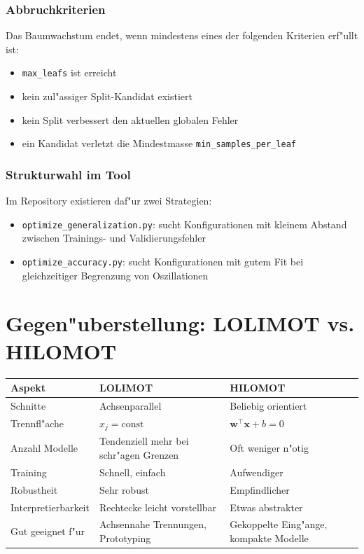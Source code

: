 \documentclass[12pt,a4paper]{article}
\begin{document}
\subsubsection*{Abbruchkriterien}

Das Baumwachstum endet, wenn mindestens eines der folgenden Kriterien erf"ullt ist:
\begin{itemize}
  \item \texttt{max\_leafs} ist erreicht
  \item kein zul"assiger Split-Kandidat existiert
  \item kein Split verbessert den aktuellen globalen Fehler
  \item ein Kandidat verletzt die Mindestmasse \texttt{min\_samples\_per\_leaf}
\end{itemize}

\subsubsection*{Strukturwahl im Tool}

Im Repository existieren daf"ur zwei Strategien:
\begin{itemize}
  \item \texttt{optimize\_generalization.py}: sucht Konfigurationen mit kleinem Abstand zwischen Trainings- und Validierungsfehler
  \item \texttt{optimize\_accuracy.py}: sucht Konfigurationen mit gutem Fit bei gleichzeitiger Begrenzung von Oszillationen
\end{itemize}

\section{Gegen"uberstellung: LOLIMOT vs. HILOMOT}

\begin{center}
\begin{tabular}{p{3.5cm}p{4.5cm}p{4.5cm}}
  \toprule
  \textbf{Aspekt} & \textbf{LOLIMOT} & \textbf{HILOMOT} \\
  \midrule
  Schnitte & Achsenparallel & Beliebig orientiert \\
  Trennfl"ache & $x_j = \mathrm{const}$ & $\mathbf{w}^\top \mathbf{x} + b = 0$ \\
  Anzahl Modelle & Tendenziell mehr bei schr"agen Grenzen & Oft weniger n"otig \\
  Training & Schnell, einfach & Aufwendiger \\
  Robustheit & Sehr robust & Empfindlicher \\
  Interpretierbarkeit & Rechtecke leicht vorstellbar & Etwas abstrakter \\
  Gut geeignet f"ur & Achsennahe Trennungen, Prototyping & Gekoppelte Eing"ange, kompakte Modelle \\
  \bottomrule
\end{tabular}
\end{center}
\end{document}
